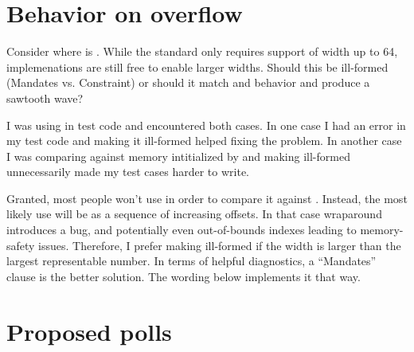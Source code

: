 \section{Behavior on overflow}\label{sec:overflow}
Consider  where  is
.
While the standard only requires support of \simd width up to 64,
implemenations are still free to enable larger widths.
Should this be ill-formed (Mandates vs. Constraint) or should it match
 and  behavior and produce a sawtooth
wave?

I was using  in test code and encountered both cases.
In one case I had an error in my test code and making it ill-formed helped fixing the problem.
In another case I was comparing against memory intitialized by 
and making  ill-formed unnecessarily made my test cases harder
to write.

Granted, most people won't use  in order to compare it against
\std{}.
Instead, the most likely use will be as a sequence of increasing offsets.
In that case wraparound introduces a bug, and potentially even out-of-bounds
indexes leading to memory-safety issues.
Therefore, I prefer making  ill-formed if the \simd width is
larger than the largest representable number.
In terms of helpful diagnostics, a “Mandates” clause is the better solution.
The wording below implements it that way.

\section{Proposed polls}









